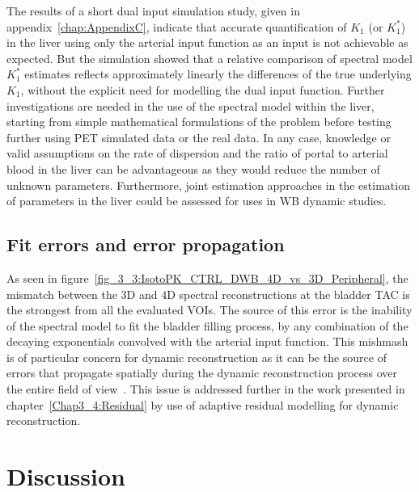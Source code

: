 The results of a short dual input simulation study, given in appendix~\ref{chap:AppendixC}, indicate that accurate quantification of $K_1$ (or $K_1^{*}$) in the liver using only the arterial input function as an input is not achievable as expected. 
But the simulation showed that a relative comparison of spectral model $K_1^{*}$ estimates reflects approximately linearly the differences of the true underlying $K_1$, without the explicit need for modelling the dual input function.
Further investigations are needed in the use of the spectral model within the liver, starting from simple mathematical formulations of the problem before testing further using PET simulated data or the real data. In any case, knowledge or valid assumptions on the rate of dispersion and the ratio of portal to arterial blood in the liver can be advantageous as they would reduce the number of unknown parameters. Furthermore, joint estimation approaches in the estimation of parameters in the liver could be assessed for uses in WB dynamic studies.

\subsection{Fit errors and error propagation}
\label{sub_section:residuals}
As seen in figure~\ref{fig_3_3:IsotoPK_CTRL_DWB_4D_vs_3D_Peripheral}, the mismatch between the 3D and 4D spectral reconstructions at the bladder TAC is the strongest from all the evaluated VOIs. The source of this error is the inability of the spectral model to fit the bladder filling process, by any combination of the decaying exponentials convolved with the arterial input function. This mishmash is of particular concern for dynamic reconstruction as it can be the source of errors that propagate spatially during the dynamic reconstruction process over the entire field of view~\cite{Kotasidis2014c,Kotasidis2016a}. 
This issue is addressed further in the work presented in chapter~\ref{Chap3_4:Residual} by use of adaptive residual modelling for dynamic reconstruction.

\section{Discussion}

